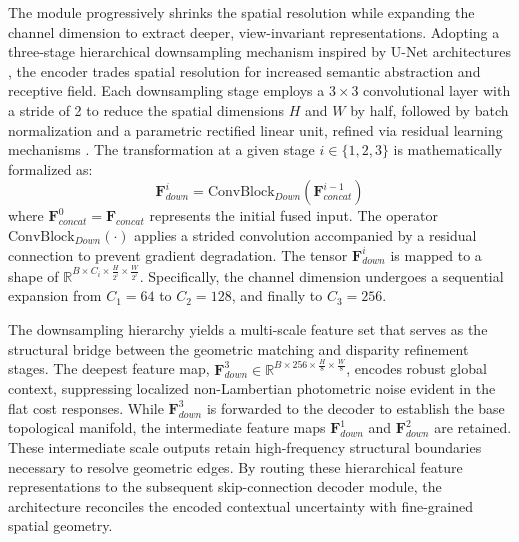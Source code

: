 \documentclass[lettersize,journal]{IEEEtran}
\begin{document}
The module progressively shrinks the spatial resolution while expanding the channel dimension to extract deeper, view-invariant representations. Adopting a three-stage hierarchical downsampling mechanism inspired by U-Net architectures \cite{ronneberger2015}, the encoder trades spatial resolution for increased semantic abstraction and receptive field. Each downsampling stage employs a $3 \times 3$ convolutional layer with a stride of 2 to reduce the spatial dimensions $H$ and $W$ by half, followed by batch normalization and a parametric rectified linear unit, refined via residual learning mechanisms \cite{he2016}. The transformation at a given stage $i \in \{1, 2, 3\}$ is mathematically formalized as:
\begin{equation}
\mathbf{F}_{down}^{i} = \text{ConvBlock}_{Down} \left( \mathbf{F}_{concat}^{i-1} \right)
\end{equation}
where $\mathbf{F}_{concat}^{0} = \mathbf{F}_{concat}$ represents the initial fused input. The operator $\text{ConvBlock}_{Down}(\cdot)$ applies a strided convolution accompanied by a residual connection to prevent gradient degradation. The tensor $\mathbf{F}_{down}^{i}$ is mapped to a shape of $\mathbb{R}^{B \times C_i \times \frac{H}{2^i} \times \frac{W}{2^i}}$. Specifically, the channel dimension undergoes a sequential expansion from $C_1 = 64$ to $C_2 = 128$, and finally to $C_3 = 256$.

The downsampling hierarchy yields a multi-scale feature set that serves as the structural bridge between the geometric matching and disparity refinement stages. The deepest feature map, $\mathbf{F}_{down}^{3} \in \mathbb{R}^{B \times 256 \times \frac{H}{8} \times \frac{W}{8}}$, encodes robust global context, suppressing localized non-Lambertian photometric noise evident in the flat cost responses. While $\mathbf{F}_{down}^{3}$ is forwarded to the decoder to establish the base topological manifold, the intermediate feature maps $\mathbf{F}_{down}^{1}$ and $\mathbf{F}_{down}^{2}$ are retained. These intermediate scale outputs retain high-frequency structural boundaries necessary to resolve geometric edges. By routing these hierarchical feature representations to the subsequent skip-connection decoder module, the architecture reconciles the encoded contextual uncertainty with fine-grained spatial geometry.

\subsection{}
\end{document}
